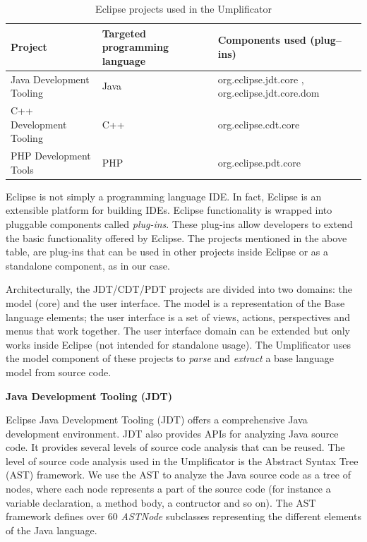 \begin{table}[h]
\caption{Eclipse projects used in the Umplificator}
\label{table:xdtProjects}
\begin{tabularx}{\textwidth}{l|YY}
\toprule
{}
\textbf{Project} & \textbf{Targeted programming language}  & \textbf{Components used (plug--ins)}  \\ \hline
	Java Development Tooling & Java   & org.eclipse.jdt.core , org.eclipse.jdt.core.dom  \\ \hline
	C++ Development Tooling  & C++   & org.eclipse.cdt.core \\ \hline
	PHP Development Tools	 & PHP   & org.eclipse.pdt.core \\ \hline
\end{tabularx}
\end{table}

Eclipse is not simply a programming language IDE. In fact,  Eclipse is an extensible platform for building IDEs. Eclipse functionality is wrapped into pluggable components called \textit{plug-ins}. These plug-ins allow developers to extend the basic functionality offered by Eclipse. The projects mentioned in the above table, are plug-ins that can be used in other projects inside Eclipse or as a standalone component, as in our case.

Architecturally, the JDT/CDT/PDT projects are divided into two domains: the model (core) and the user interface. The model is a representation of the Base language elements; the user interface is a set of views, actions, perspectives and menus that work together. The user interface domain can be extended but only works inside Eclipse (not intended for standalone usage).  The Umplificator uses the model component of these projects to \textit{parse} and \textit{extract} a base language model from source code. 

\textbf{Java Development Tooling (JDT)}

 Eclipse Java Development Tooling (JDT) \cite{jdtProject} offers a comprehensive Java development environment. JDT also provides APIs for analyzing Java source code. It provides several levels of source code analysis that can be reused. The level of source code analysis used in the Umplificator is the Abstract Syntax Tree (AST) framework. We use the AST to analyze the Java source code as a tree of nodes, where each node represents a part of the source code (for instance a variable declaration, a method body, a contructor and so on). The AST framework defines over 60 \textit{ASTNode} \cite{astnodeapi} subclasses representing the different elements of the Java language. 
 
